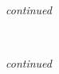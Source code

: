 \begin{figure}[!htbp]
\ContinuedFloat
 \\
 \caption[]{\emph{continued}}
\end{figure}
\begin{figure}[!htbp]
\ContinuedFloat
 \\
 \caption[]{\emph{continued}}
\end{figure}
